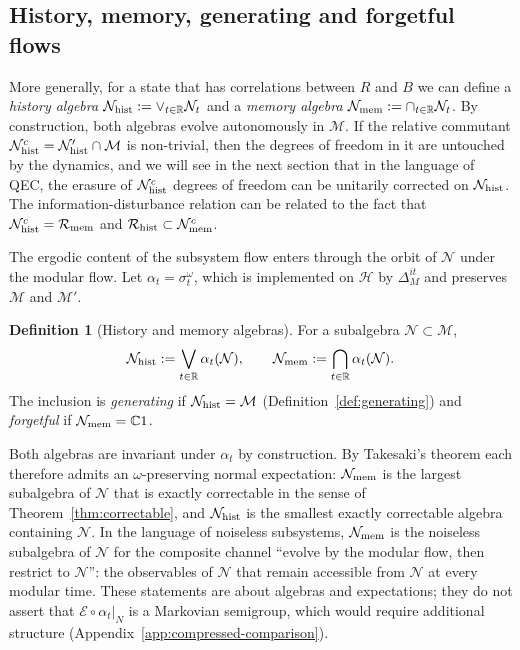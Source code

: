 \documentclass[a4paper,11pt]{article}
\theoremstyle{definition}
\newtheorem{definition}{Definition}[section]
\newcommand{\mE}{\mathcal{E}}
\begin{document}
\subsection{History, memory, generating and forgetful flows}\label{subsec:QEC-history-memory}

More generally, for a state that has correlations between $R$ and $B$ we can define a {\it history algebra} $\mathcal N_{\rm hist}:=\vee_{t\in\mathbb{R}}\mathcal N_t$ and a {\it memory algebra} $\mathcal N_{\rm mem}:=\cap_{t\in\mathbb{R}}\mathcal N_t$. By construction, both algebras evolve autonomously in $\mathcal M$. If the relative commutant $\mathcal N_{\rm hist}^c=\mathcal N'_{\rm hist}\cap \mathcal M$ is non-trivial, then the degrees of freedom in it are untouched by the dynamics, and we will see in the next section that in the language of QEC, the erasure of $\mathcal N_{\rm hist}^c$ degrees of freedom can be unitarily corrected on $\mathcal N_{\rm hist}$. The information-disturbance relation can be related to the fact that $\mathcal N_{\rm hist}^c=\mathcal R_{\rm mem}$ and $\mathcal R_{\rm hist}\subset \mathcal N_{\rm mem}^c$. 



The ergodic content of the subsystem flow enters through the orbit of $\mathcal N$ under the modular flow. Let $\alpha_t=\sigma^{\omega}_t$, which is implemented on $\mathcal H$ by $\Delta_M^{it}$ and preserves $\mathcal M$ and $\mathcal M'$.

\begin{definition}[History and memory algebras]\label{def:history-memory}
For a subalgebra $\mathcal N\subset\mathcal M$,
\begin{equation}
 \mathcal N_{\rm hist}:=\bigvee_{t\in\mathbb R}\alpha_t(\mathcal N),\qquad
 \mathcal N_{\rm mem}:=\bigcap_{t\in\mathbb R}\alpha_t(\mathcal N).
\end{equation}
The inclusion is \emph{generating} if $\mathcal N_{\rm hist}=\mathcal M$ (Definition~\ref{def:generating}) and \emph{forgetful} if $\mathcal N_{\rm mem}=\mathbb C1$.
\end{definition}

Both algebras are invariant under $\alpha_t$ by construction. By Takesaki's theorem each therefore admits an $\omega$-preserving normal expectation: $\mathcal N_{\rm mem}$ is the largest subalgebra of $\mathcal N$ that is exactly correctable in the sense of Theorem~\ref{thm:correctable}, and $\mathcal N_{\rm hist}$ is the smallest exactly correctable algebra containing $\mathcal N$. In the language of noiseless subsystems, $\mathcal N_{\rm mem}$ is the noiseless subalgebra of $\mathcal N$ for the composite channel ``evolve by the modular flow, then restrict to $\mathcal N$'': the observables of $\mathcal N$ that remain accessible from $\mathcal N$ at every modular time. These statements are about algebras and expectations; they do not assert that $\mE\circ\alpha_t|_N$ is a Markovian semigroup, which would require additional structure (Appendix~\ref{app:compressed-comparison}).
\end{document}
